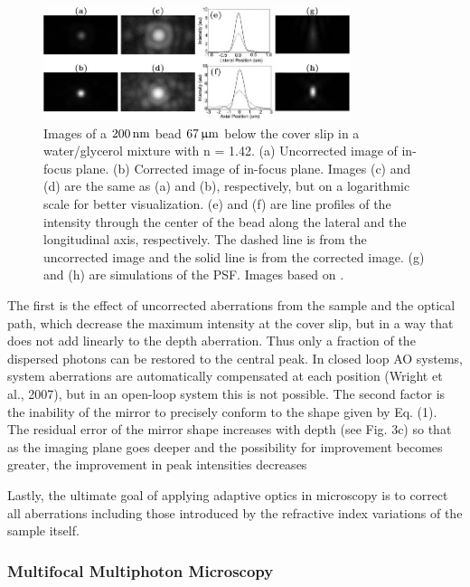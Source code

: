 \begin{figure}[htb]
	\centering
		\includegraphics[width=0.80\textwidth]{images/wide_flour_spher_All.jpg}
	\caption{Images of a $\unit[200]{nm}$ bead $\unit[67]{\upmu m}$ below the 
cover slip in a water/glycerol mixture with n = 1.42.  (a) Uncorrected image 
of in-focus plane. (b) Corrected image of in-focus plane. Images (c) and (d) 
are the same as (a) and (b), respectively, but on a logarithmic scale for 
better visualization. (e) and (f) are line profiles of the intensity through 
the center of the bead along the lateral and the longitudinal axis, 
respectively. The dashed line is from the uncorrected image and the solid 
line is from the corrected image. (g) and (h) are simulations of the PSF. 
Images based on \cite{wide_AOM_FM_spehrical_correction}.}
	\label{fig:wide_flour_spher_All} 
\end{figure}


The first is the effect of uncorrected aberrations from the sample and the 
optical path, which decrease the maximum intensity at the cover slip, but in 
a way that does not add linearly to the depth aberration. Thus only a 
fraction of the dispersed photons can be restored to the central peak. In 
closed loop AO systems, system aberrations are automatically compensated at 
each position (Wright et al., 2007), but in an open-loop system this is not 
possible. The second factor is the inability of the mirror to precisely 
conform to the shape given by Eq. (1). The residual error of the mirror shape 
increases with depth (see Fig. 3c) so that as the imaging plane goes deeper 
and the possibility for improvement becomes greater, the improvement in peak 
intensities decreases

Lastly, the ultimate goal of applying adaptive optics in microscopy is to 
correct all aberrations including those introduced by the refractive index 
variations of the sample itself.
\cite{wide_AOM_FM_spehrical_correction}


\subsubsection{Multifocal Multiphoton Microscopy}
\label{sec:MultifocalMultiphotonMicroscopy}

